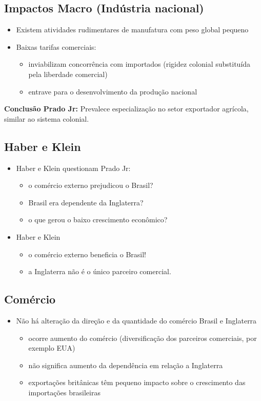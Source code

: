 \documentclass[a4paper,12pt]{article}[abntex2]
\begin{document}
\subsection{\textbf{Impactos Macro (Indústria nacional)}}
\begin{itemize}
    \item Existem atividades rudimentares de manufatura com peso global pequeno
    \item Baixas tarifas comerciais:
    \begin{itemize}
        \item inviabilizam concorrência com importados (rigidez colonial substituída pela liberdade comercial)
    \end{itemize} 
    \begin{itemize}
        \item entrave para o desenvolvimento da produção nacional\end{itemize}
\end{itemize}
\textbf{Conclusão Prado Jr:} Prevalece especialização no setor exportador agrícola, similar ao sistema colonial.
\subsection{\textbf{Haber e Klein}}
\begin{itemize}
    \item Haber e Klein questionam Prado Jr:
    \begin{itemize}
        \item o comércio externo prejudicou o Brasil?
        \item Brasil era dependente da Inglaterra?
        \item o que gerou o baixo crescimento econômico?
    \end{itemize}
    \item Haber e Klein 
    \begin{itemize}
        \item o comércio externo beneficia o Brasil! 
        \item a Inglaterra não é o único parceiro comercial.
    \end{itemize}
\end{itemize}

\subsection{\textbf{Comércio}}
\begin{itemize}
    \item Não há alteração da direção e da quantidade do comércio Brasil e Inglaterra
    \begin{itemize}
        \item ocorre aumento do comércio (diversificação dos parceiros comerciais, por exemplo EUA)
        \item não significa aumento da dependência em relação a Inglaterra
        \item exportações britânicas têm pequeno impacto sobre o crescimento das importações brasileiras
    \end{itemize}
\end{itemize}
\end{document}
